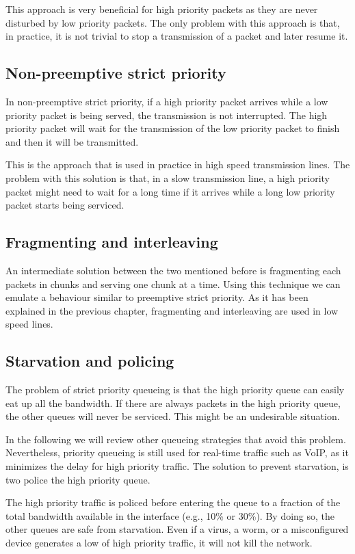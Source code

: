 This approach is very beneficial for high priority packets as they are never disturbed by low priority packets.
The only problem with this approach is that, in practice, it is not trivial to stop a transmission of a packet and later resume it.

\subsection{Non-preemptive strict priority}
In non-preemptive strict priority, if a high priority packet arrives while a low priority packet is being served, the transmission is not interrupted.
The high priority packet will wait for the transmission of the low priority packet to finish and then it will be transmitted.

This is the approach that is used in practice in high speed transmission lines.
The problem with this solution is that, in a slow transmission line, a high priority packet might need to wait for a long time if it arrives while a long low priority packet starts being serviced.

\subsection{Fragmenting and interleaving}
An intermediate solution between the two mentioned before is fragmenting each packets in chunks and serving one chunk at a time. 
Using this technique we can emulate a behaviour similar to preemptive strict priority.
As it has been explained in the previous chapter, fragmenting and interleaving are used in low speed lines.

\subsection{Starvation and policing}
The problem of strict priority queueing is that the high priority queue can easily eat up all the bandwidth.
If there are always packets in the high priority queue, the other queues will never be serviced.
This might be an undesirable situation.

In the following we will review other queueing strategies that avoid this problem.
Nevertheless, priority queueing is still used for real-time traffic such as VoIP, as it minimizes the delay for high priority traffic.
The solution to prevent starvation, is two police the high priority queue.

The high priority traffic is policed before entering the queue to a fraction of the total bandwidth available in the interface (e.g., 10\% or 30\%).
By doing so, the other queues are safe from starvation.
Even if a virus, a worm, or a misconfigured device generates a low of high priority traffic, it will not kill the network.

